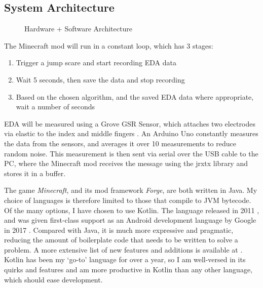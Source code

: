 \documentclass[12pt,a4paper]{article}
\begin{document}
\subsection{System Architecture}
\begin{figure}[!htbp]
	\begin{center}
\caption{Hardware + Software Architecture}
\end{center}
\end{figure}
The Minecraft mod will run in a constant loop, which has 3 stages:
\begin{enumerate}
	\item Trigger a jump scare and start recording EDA data
	\item Wait 5 seconds, then save the data and stop recording
	\item Based on the chosen algorithm, and the saved EDA data where appropriate, wait a number of seconds
\end{enumerate}

EDA will be measured using a Grove GSR Sensor, which attaches two electrodes via elastic to the index and middle fingers \cite{groveGSR}. An Arduino Uno constantly measures the data from the sensors, and averages it over 10 measurements to reduce random noise. This measurement is then sent via serial over the USB cable to the PC, where the Minecraft mod receives the message using the jrxtx library and stores it in a buffer.

The game \emph{Minecraft}, and its mod framework \emph{Forge}, are both written in Java. My choice of languages is therefore limited to those that compile to JVM bytecode. Of the many options, I have chosen to use Kotlin. The language released in 2011 \cite{kotlinRelease}, and was given first-class support as an Android development language by Google in 2017 \cite{googleKotlin}. Compared with Java, it is much more expressive and pragmatic, reducing the amount of boilerplate code that needs to be written to solve a problem. A more extensive list of new features and additions is available at \cite{kotlinVsJava}. Kotlin has been my `go-to' language for over a year, so I am well-versed in its quirks and features and am more productive in Kotlin than any other language, which should ease development.
\end{document}

